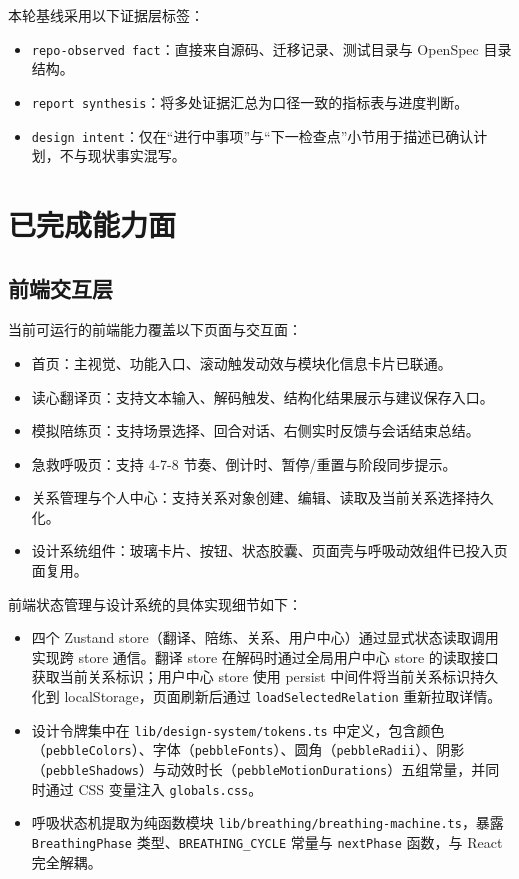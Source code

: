 本轮基线采用以下证据层标签：

\begin{itemize}
  \item \texttt{repo-observed fact}：直接来自源码、迁移记录、测试目录与 OpenSpec 目录结构。
  \item \texttt{report synthesis}：将多处证据汇总为口径一致的指标表与进度判断。
  \item \texttt{design intent}：仅在“进行中事项”与“下一检查点”小节用于描述已确认计划，不与现状事实混写。
\end{itemize}

\section{已完成能力面}

\subsection{前端交互层}

当前可运行的前端能力覆盖以下页面与交互面：

\begin{itemize}
  \item 首页：主视觉、功能入口、滚动触发动效与模块化信息卡片已联通。
  \item 读心翻译页：支持文本输入、解码触发、结构化结果展示与建议保存入口。
  \item 模拟陪练页：支持场景选择、回合对话、右侧实时反馈与会话结束总结。
  \item 急救呼吸页：支持 4-7-8 节奏、倒计时、暂停/重置与阶段同步提示。
  \item 关系管理与个人中心：支持关系对象创建、编辑、读取及当前关系选择持久化。
  \item 设计系统组件：玻璃卡片、按钮、状态胶囊、页面壳与呼吸动效组件已投入页面复用。
\end{itemize}

前端状态管理与设计系统的具体实现细节如下：

\begin{itemize}
  \item 四个 Zustand store（翻译、陪练、关系、用户中心）通过显式状态读取调用实现跨 store 通信。翻译 store 在解码时通过全局用户中心 store 的读取接口获取当前关系标识；用户中心 store 使用 persist 中间件将当前关系标识持久化到 localStorage，页面刷新后通过 \texttt{loadSelectedRelation} 重新拉取详情。
  \item 设计令牌集中在 \texttt{lib/design-system/tokens.ts} 中定义，包含颜色（\texttt{pebbleColors}）、字体（\texttt{pebbleFonts}）、圆角（\texttt{pebbleRadii}）、阴影（\texttt{pebbleShadows}）与动效时长（\texttt{pebbleMotionDurations}）五组常量，并同时通过 CSS 变量注入 \texttt{globals.css}。
  \item 呼吸状态机提取为纯函数模块 \texttt{lib/breathing/breathing-machine.ts}，暴露 \texttt{BreathingPhase} 类型、\texttt{BREATHING\_CYCLE} 常量与 \texttt{nextPhase} 函数，与 React 完全解耦。
\end{itemize}

